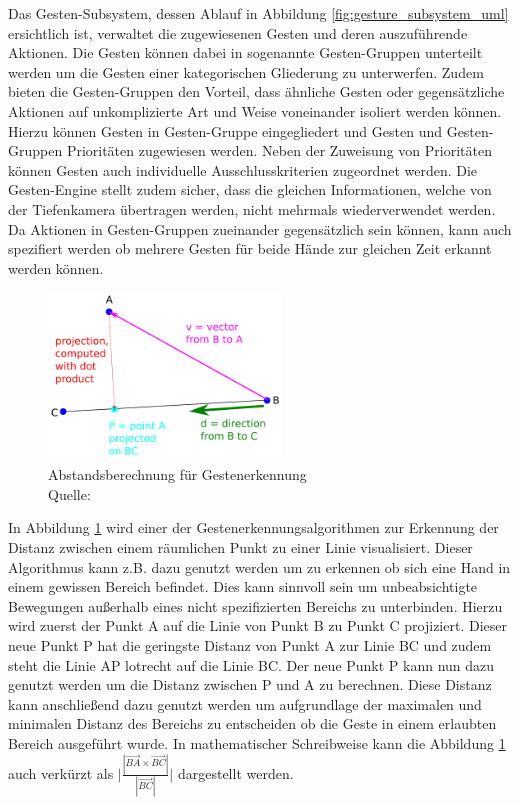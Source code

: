 Das Gesten-Subsystem, dessen Ablauf in Abbildung \ref{fig:gesture_subsystem_uml} ersichtlich ist, verwaltet die zugewiesenen Gesten und deren auszuführende Aktionen. Die Gesten können dabei in sogenannte Gesten-Gruppen unterteilt werden um die Gesten einer kategorischen Gliederung zu unterwerfen. Zudem bieten die Gesten-Gruppen den Vorteil, dass ähnliche Gesten oder gegensätzliche Aktionen auf unkomplizierte Art und Weise voneinander isoliert werden können. Hierzu können Gesten in Gesten-Gruppe eingegliedert und Gesten und Gesten-Gruppen Prioritäten zugewiesen werden. Neben der Zuweisung von Prioritäten können Gesten auch individuelle Ausschlusskriterien zugeordnet werden. Die Gesten-Engine stellt zudem sicher, dass die gleichen Informationen, welche von der Tiefenkamera übertragen werden, nicht mehrmals wiederverwendet werden. Da Aktionen in Gesten-Gruppen zueinander gegensätzlich sein können, kann auch spezifiert werden ob mehrere Gesten für beide Hände zur gleichen Zeit erkannt werden können.

\begin{figure}[htb]
	\centering
	\includegraphics[width=0.55\textwidth]{images/loesungsweg/perpendicular_distance_illustration}
	\caption[Abstandsberechnung für Gestenerkennung]{Abstandsberechnung für Gestenerkennung
	\\Quelle: \cite{geometry_perpendicular_distance_nodate}}
	\label{fig:perpendicular_distance_illustration}
\end{figure}
\FloatBarrier

In Abbildung \ref{fig:perpendicular_distance_illustration} wird einer der Gestenerkennungsalgorithmen zur Erkennung der Distanz zwischen einem räumlichen Punkt zu einer Linie visualisiert. Dieser Algorithmus kann z.B. dazu genutzt werden um zu erkennen ob sich eine Hand in einem gewissen Bereich befindet. Dies kann sinnvoll sein um unbeabsichtigte Bewegungen außerhalb eines nicht spezifizierten Bereichs zu unterbinden. Hierzu wird zuerst der Punkt A auf die Linie von Punkt B zu Punkt C projiziert. Dieser neue Punkt P hat die geringste Distanz von Punkt A zur Linie BC und zudem steht die Linie AP lotrecht auf die Linie BC. Der neue Punkt P kann nun dazu genutzt werden um die Distanz zwischen P und A zu berechnen. Diese Distanz kann anschließend dazu genutzt werden um aufgrundlage der maximalen und minimalen Distanz des Bereichs zu entscheiden ob die Geste in einem erlaubten Bereich ausgeführt wurde. In mathematischer Schreibweise kann die Abbildung \ref{fig:perpendicular_distance_illustration} auch verkürzt als $\biggl| \frac{| \overrightarrow{BA} \times \overrightarrow{BC} |}{| \overrightarrow{BC} |} \biggl|$ dargestellt werden.

